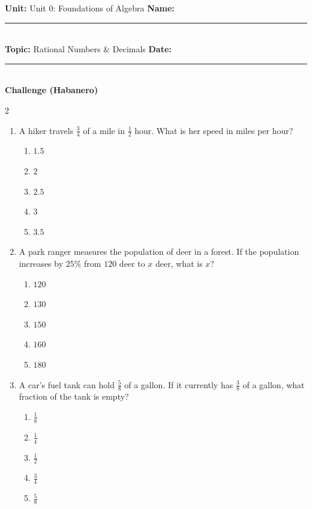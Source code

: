 \documentclass[10pt]{article}
\begin{document}
\enlargethispage{2.5cm}

\begin{tcolorbox}[colback=mainblue!5, colframe=mainblue, sharp corners, boxrule=0.5pt]
    \small \textbf{Unit:} Unit 0: Foundations of Algebra \hfill \textbf{Name:} \rule{3cm}{0.4pt} \\
    \small \textbf{Topic:} Rational Numbers & Decimals \hfill \textbf{Date:} \rule{2cm}{0.4pt} \\
    \centering \textbf{\large Challenge (Habanero)}
\end{tcolorbox}

\vspace{0.2cm}

\begin{multicols}{2}
\begin{enumerate}[label=\textbf{Q\arabic*.}, leftmargin=*, itemsep=6pt, parsep=0pt]

  \item \small A hiker travels $\frac{3}{4}$ of a mile in $\frac{1}{2}$ hour. What is her speed in miles per hour?
  \begin{enumerate}[label=(\Alph*), leftmargin=0.6cm, nosep, itemsep=2pt]
    \item $1.5$
    \item $2$
    \item $2.5$
    \item $3$
    \item $3.5$
  \end{enumerate}

  \item \small A park ranger measures the population of deer in a forest. If the population increases by $25\%$ from $120$ deer to $x$ deer, what is $x$?
  \begin{enumerate}[label=(\Alph*), leftmargin=0.6cm, nosep, itemsep=2pt]
    \item $120$
    \item $130$
    \item $150$
    \item $160$
    \item $180$
  \end{enumerate}

  \item \small A car's fuel tank can hold $\frac{5}{8}$ of a gallon. If it currently has $\frac{3}{8}$ of a gallon, what fraction of the tank is empty?
  \begin{enumerate}[label=(\Alph*), leftmargin=0.6cm, nosep, itemsep=2pt]
    \item $\frac{1}{8}$
    \item $\frac{1}{4}$
    \item $\frac{1}{2}$
    \item $\frac{3}{4}$
    \item $\frac{5}{8}$
  \end{enumerate}


\end{enumerate}
\end{multicols}
\end{document}
